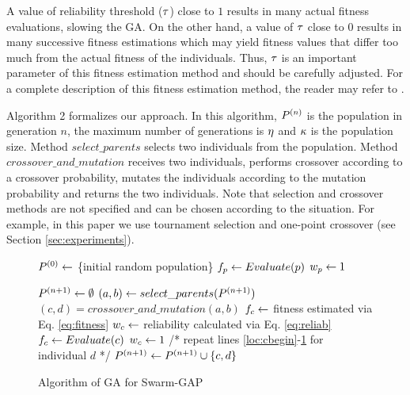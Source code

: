 \documentclass[conference]{IEEEtran}
\begin{document}

A value of reliability threshold ($\tau$) close to $1$ results in many actual fitness evaluations, slowing the GA. On the other hand, a value of $\tau$ close to $0$ results in many successive fitness estimations which may yield fitness values that differ too  much from the actual fitness of the individuals. Thus, $\tau$ is an important parameter of this fitness estimation method and should be carefully adjusted. For a complete description of this fitness estimation method, the reader may refer to \cite{Salami&Hendtlass2003}.

Algorithm 2 formalizes our approach. In this algorithm, $P^{(n)}$ is the population in generation $n$, the maximum number of generations is $\eta$ and $\kappa$ is the population size. Method $select\_parents$ selects two individuals from the population. Method $crossover\_and\_mutation$ receives two individuals, performs crossover according to a crossover probability, mutates the individuals according to the mutation probability and returns the two individuals. Note that selection and crossover methods are not specified and can be chosen according to the situation. For example, in this paper we use tournament selection and one-point crossover (see Section \ref{sec:experiments}).

\begin{figure}[ht]
\begin{algorithmic}[1]
\STATE $P^{(0)} \gets$ \{initial random population\}
\STATE $f_{p} \gets Evaluate(p)$
\STATE $w_{p} \gets 1$
\ENDFOR

\STATE $P^{(n+1)} \gets \emptyset$
\STATE $(a,b) \gets select\_parents(P^{(n+1)})$
\STATE $(c,d) = crossover\_and\_mutation(a,b)$
\STATE $f_{c} \gets $ fitness estimated via Eq. \ref{eq:fitness} \label{loc:cbegin}
\STATE $w_{c} \gets $ reliability calculated via Eq. \ref{eq:reliab}
\STATE $f_{c} \gets Evaluate(c)$
\STATE $w_{c} \gets 1$ \label{loc:cend}
\ENDIF
\STATE /* repeat lines \ref{loc:cbegin}-\ref{loc:cend} for individual $d$ */
\STATE $P^{(n+1)} \gets P^{(n+1)} \cup \{c,d\}$
\ENDWHILE
\ENDFOR
\end{algorithmic}
\caption{Algorithm of GA for Swarm-GAP}
\end{figure}
\end{document}
